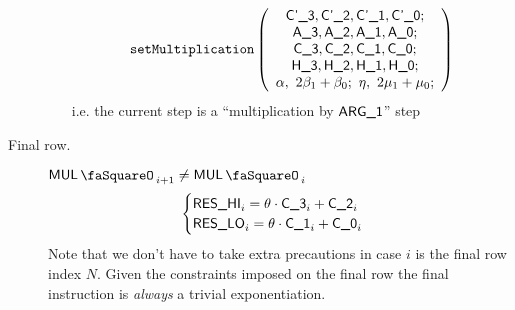 \begin{description}
\begin{enumerate}
				\[
					\texttt{setMultiplication}
					\left( \begin{array}{c}
						\textsf{C'\_3}, \textsf{C'\_2}, \textsf{C'\_1}, \textsf{C'\_0};             \\
						\textsf{A\_3}, \textsf{A\_2}, \textsf{A\_1}, \textsf{A\_0};                 \\
						\textsf{C\_3}, \textsf{C\_2}, \textsf{C\_1}, \textsf{C\_0};                 \\
						\textsf{H\_3}, \textsf{H\_2}, \textsf{H\_1}, \textsf{H\_0};                 \\
						\alpha, ~ 2\beta_{1} + \beta_{0}; ~ \eta, ~ 2\mu_{1} + \mu_{0}; \\
					\end{array} \right)
				\]
				i.e. the current step is a ``multiplication by $\textsf{ARG}\textsf{\_1}$'' step
		\end{enumerate}
	\item[Final row.]
		\If $\mulStamp_{i + 1} \neq \mulStamp_{i}$ \Then
		\[
			\begin{cases}
				\textsf{RES}\textsf{\_HI}_{i} = \theta \cdot \textsf{C\_3}_{i} + \textsf{C\_2}_{i} \\
				\textsf{RES}\textsf{\_LO}_{i} = \theta \cdot \textsf{C\_1}_{i} + \textsf{C\_0}_{i} \\
			\end{cases}
		\]
		Note that we don't have to take extra precautions in case $i$ is the final row index $N$. Given the constraints imposed on the final row the final instruction is \emph{always} a trivial exponentiation.
\end{description}
